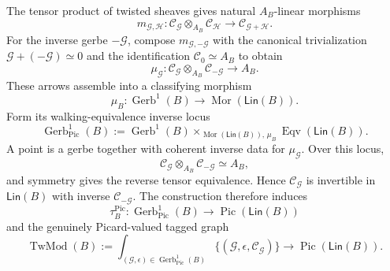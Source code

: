 \begin{construction}
The tensor product of twisted sheaves gives natural $A_B$-linear morphisms
\[
m_{\mathcal G,\mathcal H}:
\mathcal C_{\mathcal G}\otimes_{A_B}\mathcal C_{\mathcal H}
\longrightarrow
\mathcal C_{\mathcal G+\mathcal H}.
\]
For the inverse gerbe $-\mathcal G$, compose $m_{\mathcal G,-\mathcal G}$ with
the canonical trivialization
$\mathcal G+(-\mathcal G)\simeq0$ and the identification
$\mathcal C_0\simeq A_B$ to obtain
\[
\mu_{\mathcal G}:
\mathcal C_{\mathcal G}\otimes_{A_B}\mathcal C_{-\mathcal G}
\longrightarrow A_B.
\]
These arrows assemble into a classifying morphism
\[
\mu_B:
\operatorname{Gerb}^{1}(B)
\longrightarrow
\operatorname{Mor}(\mathsf{Lin}(B)).
\]
Form its walking-equivalence inverse locus
\[
\boxed{
\operatorname{Gerb}^{1}_{\mathrm{Pic}}(B)
:=
\operatorname{Gerb}^{1}(B)
\mathop{\times}_{\operatorname{Mor}(\mathsf{Lin}(B)),\,\mu_B}
\operatorname{Eqv}(\mathsf{Lin}(B)).
}
\]
A point is a gerbe together with coherent inverse data for
$\mu_{\mathcal G}$.  Over this locus,
\[
\mathcal C_{\mathcal G}\otimes_{A_B}\mathcal C_{-\mathcal G}
\simeq A_B,
\]
and symmetry gives the reverse tensor equivalence.  Hence
$\mathcal C_{\mathcal G}$ is invertible in $\mathsf{Lin}(B)$ with inverse
$\mathcal C_{-\mathcal G}$.  The construction therefore induces
\[
\tau_B^{\mathrm{Pic}}:
\operatorname{Gerb}^{1}_{\mathrm{Pic}}(B)
\longrightarrow
\operatorname{Pic}(\mathsf{Lin}(B))
\]
and the genuinely Picard-valued tagged graph
\[
\boxed{
\operatorname{TwMod}(B)
:=
\int_{(\mathcal G,\epsilon)\in
\operatorname{Gerb}^{1}_{\mathrm{Pic}}(B)}
\{(\mathcal G,\epsilon,\mathcal C_{\mathcal G})\}
\longrightarrow
\operatorname{Pic}(\mathsf{Lin}(B)).
}
\]


\end{construction}
